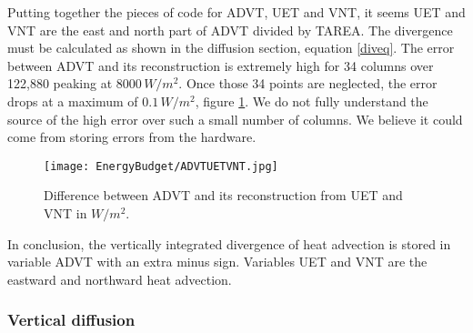\begin{appendices}
Putting together the pieces of code for ADVT, UET and VNT, it seems UET and VNT are the east and north part of ADVT divided by TAREA. The divergence must be calculated as shown in the diffusion section, equation \ref{diveq}. The error between ADVT and its reconstruction is extremely high for 34 columns over 122,880  peaking at $8000 \, W/m^2$. Once those 34 points are neglected, the error drops at a maximum of $0.1 \, W/m^2$, figure \ref{advt}. We do not fully understand the source of the high error over such a small number of columns. We believe it could come from storing errors from the hardware. 

\begin{figure}[t]
\center
\texttt{[image: EnergyBudget/ADVTUETVNT.jpg]}
\caption{Difference between ADVT and its reconstruction from UET and VNT in $W/m^2$.}
\label{advt}
\end{figure}

In conclusion, the vertically integrated divergence of heat advection is stored in variable ADVT with an extra minus sign. Variables UET and VNT are the eastward and northward heat advection. 


\subsubsection{Vertical diffusion}\label{vdiff}


\end{appendices}
